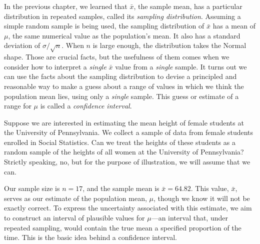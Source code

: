 \documentclass[
  letterpaper,
  DIV=11,
  numbers=noendperiod]{scrreprt}
\begin{document}
In the previous chapter, we learned that \(\bar{x}\), the sample mean,
has a particular distribution in repeated samples, called its
\emph{sampling distribution}. Assuming a simple random sample is being
used, the sampling distribution of \(\bar{x}\) has a mean of \(\mu\),
the same numerical value as the population's mean. It also has a
standard deviation of \(\sigma/\sqrt{n}\). When \(n\) is large enough,
the distribution takes the Normal shape. Those are crucial facts, but
the usefulness of them comes when we consider how to interpret a
\emph{single} \(\bar{x}\) value from a \emph{single} sample. It turns
out we can use the facts about the sampling distribution to devise a
principled and reasonable way to make a guess about a range of values in
which we think the population mean lies, using only a \emph{single}
sample. This guess or estimate of a range for \(\mu\) is called a
\emph{confidence interval}.

Suppose we are interested in estimating the mean height of female
students at the University of Pennsylvania. We collect a sample of data
from female students enrolled in Social Statistics. Can we treat the
heights of these students as a random sample of the heights of all women
at the University of Pennsylvania? Strictly speaking, no, but for the
purpose of illustration, we will assume that we can.

Our sample size is \(n = 17\), and the sample mean is
\(\bar{x} = 64.82\). This value, \(\bar{x}\), serves as our estimate of
the population mean, \(\mu\), though we know it will not be exactly
correct. To express the uncertainty associated with this estimate, we
aim to construct an interval of plausible values for \(\mu\)---an
interval that, under repeated sampling, would contain the true mean a
specified proportion of the time. This is the basic idea behind a
confidence interval.
\end{document}
